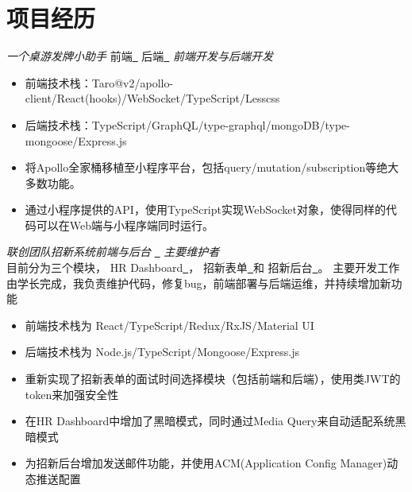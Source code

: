 \documentclass{uniquecv}
\begin{document}

\section{项目经历}

{\it 一个桌游发牌小助手}
前端\quad \href{https://github.com/colinaaa/ddwp-frontend}{{\color{gray}{\faLink}}~}
后端\quad \href{https://github.com/colinaaa/ddwp-backend}{{\color{gray}{\faLink}}~}
\quad \emph{前端开发与后端开发}
\begin{itemize}
  \item 前端技术栈：Taro@v2/apollo-client/React(hooks)/WebSocket/TypeScript/Lesscss
  \item 后端技术栈：TypeScript/GraphQL/type-graphql/mongoDB/type-mongoose/Express.js
  \item 将Apollo全家桶移植至小程序平台，包括query/mutation/subscription等绝大多数功能。
  \item 通过小程序提供的API，使用TypeScript实现WebSocket对象，使得同样的代码可以在Web端与小程序端同时运行。
\end{itemize}

{\it 联创团队招新系统前端与后台}
\quad \href{https://github.com/UniqueStudio/UniqueRecruitmentDashboard}{{\color{gray}{\faLink}}~}
\quad \emph{主要维护者}
\vspace{0.4ex}
\\
目前分为三个模块，
{HR Dashboard}\href{https://hr.hustunique.com}{{\color{gray}{\faLink}}~}，
{招新表单}\href{https://join.hustunique.com}{{\color{gray}{\faLink}}~}和
{招新后台}\href{https://github.com/UniqueStudio/UniqueRecruitmentBackend}{{\color{gray}{\faLink}}~}。
主要开发工作由学长完成，我负责维护代码，修复bug，前端部署与后端运维，并持续增加新功能

\begin{itemize}
  \item 前端技术栈为 React/TypeScript/Redux/RxJS/Material UI
  \item 后端技术栈为 Node.js/TypeScript/Mongoose/Express.js
  \item 重新实现了招新表单的面试时间选择模块（包括前端和后端），使用类JWT的token来加强安全性
  \item 在HR Dashboard中增加了黑暗模式，同时通过Media Query来自动适配系统黑暗模式
  \item 为招新后台增加发送邮件功能，并使用ACM(Application Config Manager)动态推送配置
\end{itemize}
\end{document}
